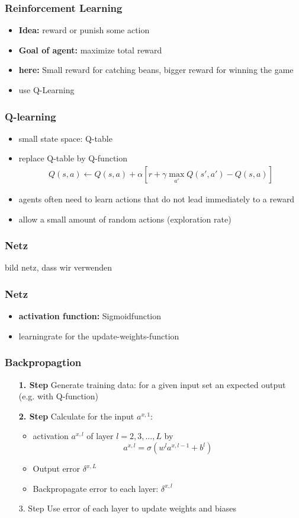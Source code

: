 \documentclass{beamer}
\begin{document}
 \begin{frame}
 \frametitle{Reinforcement Learning}
 \begin{itemize}
 \item \textbf{Idea:} reward or punish some action
 \item \textbf{Goal of agent:} maximize total reward
 \item \textbf{here:} Small reward for catching beans, bigger reward for winning the game
 \item use Q-Learning
 \end{itemize}
 \end{frame}
 
  \begin{frame}
  \frametitle{Q-learning}
 \begin{itemize}
 \item small state space: Q-table
  \item replace Q-table by Q-function 
  \begin{align}
  Q(s,a) \leftarrow Q(s,a)+\alpha [r+\gamma \max_{a'} Q(s',a') -Q(s,a)]
  \end{align}
 \item agents often need to learn actions that do not lead immediately to a reward
 \item allow a small amount of random actions (exploration rate)
 \end{itemize}
 \end{frame}
 
 \begin{frame}
 \frametitle{Netz}
 bild netz, dass wir verwenden
 \end{frame}
  \begin{frame}
 \frametitle{Netz}
\begin{itemize}
\item \textbf{activation function:} Sigmoidfunction
\item learningrate for the update-weights-function
\end{itemize}
 \end{frame}
 
 \begin{frame}
 \frametitle{Backpropagtion}
 \begin{itemize}
 \item[\textbf{1. Step}] Generate training data: for a given input set an expected output (e.g. with Q-function)
 \item[\textbf{2. Step}] Calculate for the input $a^{x,1}$:
 \begin{itemize}
 \item activation $a^{x,l}$ of layer $l=2,3,...,L$ by
 $$a^{x,l} = \sigma(w^l a^{x,l-1} + b^l)$$
 \item Output error $\delta^{x,L}$
 \item Backpropagate error to each layer: $\delta^{x,l}$
 \end{itemize}
 \item[3. Step] Use error of each layer to update weights and biases 
 \end{itemize}
 \end{frame}
 
\end{document}
